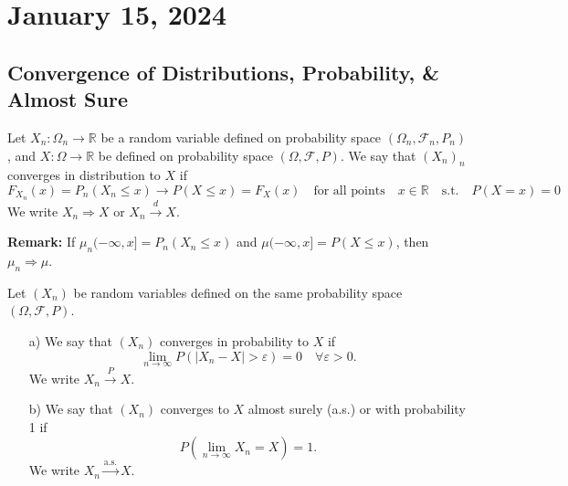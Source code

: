 \newpage
\section{January 15, 2024}
\subsection{Convergence of Distributions, Probability, \& Almost Sure}
\begin{definition}
Let \( X_n: \Omega_n \rightarrow \mathbb{R} \) be a random variable defined on probability space \( (\Omega_n, \mathcal{F}_n, P_n) \), and \( X: \Omega \rightarrow \mathbb{R} \) be defined on probability space \( (\Omega, \mathcal{F}, P) \). We say that \( (X_n)_n \) converges in distribution to \( X \) if
\[
F_{X_n}(x) = P_n(X_n \leq x) \rightarrow P(X \leq x) = F_X(x) \quad \text{for all points} \quad x \in \mathbb{R} \quad \text{s.t.} \quad P(X = x) = 0
\]
We write \( X_n \Rightarrow X \) or \( X_n \xrightarrow{d} X \).

\textbf{Remark:} If \( \mu_n(-\infty, x] = P_n(X_n \leq x) \) and \( \mu(-\infty, x] = P(X \leq x) \), then \( \mu_n \Rightarrow \mu \).
\end{definition}

\begin{definition}
Let \( (X_n) \) be random variables defined on the same probability space \( (\Omega, \mathcal{F}, P) \). 
\begin{enumerate}
    \item[a)] We say that \( (X_n) \) converges in probability to \( X \) if
    \[ \lim_{n \to \infty} P(\lvert X_n - X \rvert > \varepsilon) = 0 \quad \forall \varepsilon > 0. \]
    We write \( X_n \xrightarrow{P} X \).
    
    \item[b)] We say that \( (X_n) \) converges to \( X \) almost surely (a.s.) or with probability 1 if
    \[ P(\lim_{n \to \infty} X_n = X) = 1. \]
    We write \( X_n \xrightarrow{\text{a.s.}} X \).
\end{enumerate}
\end{definition}

